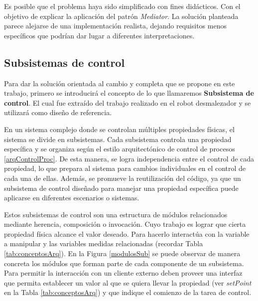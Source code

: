 Es posible que el problema haya sido simplificado con fines didácticos. Con el objetivo de explicar la aplicación del patrón \textit{Mediator}. La solución planteada parece alejarse de una implementación realista, dejando requisitos menos específicos que podrían dar lugar a diferentes interpretaciones.



\subsection*{Subsistemas de control}
\label{subsistema}

Para dar la solución orientada al cambio y completa que se propone en este trabajo, primero se introducirá el concepto de lo que llamaremos \textbf{Subsistema de control}. El cual fue extraído del trabajo realizado en el robot desmalezador \citep{paperPomponio} y se utilizará como diseño de referencia.

En un sistema complejo donde se controlan múltiples propiedades físicas, el sistema se divide en subsistemas. Cada subsistema controla una propiedad específica y se organiza según el estilo arquitectónico de control de procesos \ref{arqControlProc}. De esta manera, se logra independencia entre el control de cada propiedad, lo que prepara al sistema para cambios individuales en el control de cada una de ellas. Además, se promueve la reutilización del código, ya que un subsistema de control diseñado para manejar una propiedad específica puede aplicarse en diferentes escenarios o sistemas.

Estos subsistemas de control son una estructura de módulos relacionados mediante herencia, composición o invocación. Cuyo trabajo es lograr que cierta propiedad física alcance el valor deseado. Para hacerlo interactúa con la variable a manipular y las variables medidas relacionadas (recordar Tabla \ref{tab:conceptosArq}). En la Figura \ref{modulosSub} se puede observar de manera concreta los módulos que forman parte de cada componente de un subsistema. Para permitir la interacción con un cliente externo deben proveer una interfaz que permita establecer un valor al que se quiera llevar la propiedad (ver \textit{setPoint} en la Tabla \ref{tab:conceptosArq}) y que indique el comienzo de la tarea de control.

